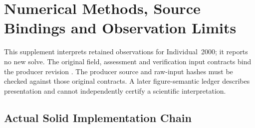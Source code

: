 \section{Numerical Methods, Source Bindings and Observation Limits}
\label{sec:numerical-methods-details}
This supplement interprets retained observations for Individual~2000; it reports no new solve. The original field, assessment and verification input contracts bind the producer revision . The producer source and raw-input hashes must be checked against those original contracts. A later figure-semantic ledger describes presentation and cannot independently certify a scientific interpretation.

\subsection{Actual Solid Implementation Chain}
